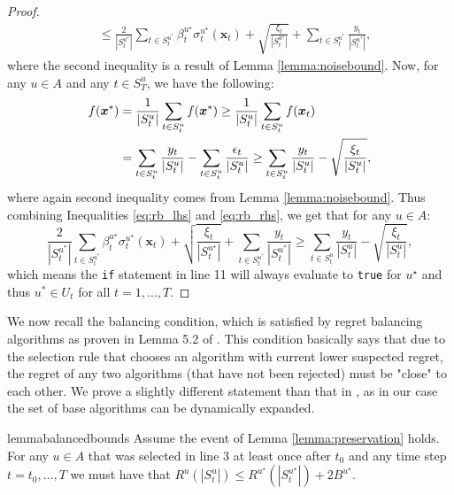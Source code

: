 \documentclass{article}
\theoremstyle{plain}
\theoremstyle{definition}
\theoremstyle{remark}
\theoremstyle{plain}
\begin{document}
\begin{proof}
\begin{align}
    &\le \frac{2}{|S_t^{u^*}|}  \sum_{t \in S_t^{u^*}} \beta_t^{u^\star}\sigma_t^{u^\star}(\bm{x}_t) + \sqrt{\frac{\xi_t}{|S_t^{u^\star}|}}+  \sum_{t \in S_t^{u^*}} \frac{y_t}{|S_t^{u^*}|}, 
\end{align}
where the second inequality is a result of Lemma \ref{lemma:noisebound}. Now, for any $u \in A$ and any $t \in S_T^u$, we have the following:
\begin{align} \label{eq:rb_rhs}
    f(\bm{x}^*) &= \frac{1}{|S_t^u|}\sum_{t \in S_t^u} f(\bm{x}^*) 
    \ge \frac{1}{|S_t^u|}\sum_{t \in S_t^u} f(\bm{x}_t) \notag \\
     &=
     \sum_{t \in S_t^u}\frac{y_t}{|S_t^u|}   - \sum_{t \in S_t^u}\frac{\epsilon_t}{|S_t^u|}  \ge \sum_{t \in S_t^u} \frac{y_t}{|S_t^u|}   - \sqrt{\frac{\xi_t}{|S_t^u|} } ,
\end{align}
where again second inequality comes from Lemma \ref{lemma:noisebound}.
Thus combining Inequalities \ref{eq:rb_lhs} and \ref{eq:rb_rhs}, we get that for any $u \in A$:
\begin{equation*}
    \frac{2}{|S_t^{u^*}|}  \sum_{t \in S_t^{u^*}} \beta_t^{u^\star}\sigma_t^{u^\star}(\bm{x}_t)  + \sqrt{\frac{\xi_t}{|S_t^{u^\star}|}}+  \sum_{t \in S_t^{u^*}} \frac{y_t}{|S_t^{u^*}|} \ge \sum_{t \in S_t^u} \frac{y_t}{|S_t^u|}   - \sqrt{\frac{\xi_t}{|S_t^u|} } ,
\end{equation*}
which means the \texttt{if} statement in line 11 will always evaluate to \texttt{true} for $u^\star$ and thus $u^* \in U_{t}$ for all $t=1, \dots, T$. 
\end{proof}
We now recall the balancing condition, which is satisfied by regret balancing algorithms as proven in Lemma 5.2 of \cite{pacchiano2020regret}. This condition basically says that due to the selection rule that chooses an algorithm with current lower suspected regret, the regret of any two algorithms (that have not been rejected) must be "close" to each other. We prove a slightly different statement than that in \cite{pacchiano2020regret}, as in our case the set of base algorithms can be dynamically expanded.
\begin{restatable}[]{lemma}{balancedbounds} \label{lemma:balancedbounds}
Assume the event of Lemma \ref{lemma:preservation} holds. For any  $u \in A$ that was selected in line 3 at least once after $t_0$ and any time step $t=t_0,\dots,T$ we must have that $R^{u}(|S_t^u|) \le R^{u^\star}(|S_t^{u^\star}|) + 2B^{u^\star}$.

\end{restatable}
\end{document}
